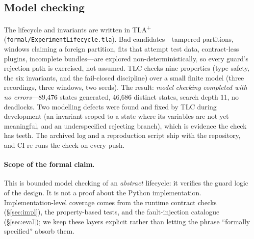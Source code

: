 \subsection{Model checking}

The lifecycle and invariants are written in TLA\textsuperscript{+}
(\texttt{formal/ExperimentLifecycle.tla}). Bad candidates---tampered
partitions, windows claiming a foreign partition, fits that attempt test
data, contract-less plugins, incomplete bundles---are explored
non-deterministically, so every guard's rejection path is exercised, not
assumed. TLC checks nine properties (type safety, the six invariants, and
the fail-closed discipline) over a small finite model (three recordings,
three windows, two seeds). The result: \emph{model checking completed with
no errors}---89{,}476 states generated, 46{,}686 distinct states, search
depth 11, no deadlocks. Two modelling defects were found and fixed by TLC
during development (an invariant scoped to a state where its variables are
not yet meaningful, and an underspecified rejecting branch), which is
evidence the check has teeth. The archived log and a reproduction script
ship with the repository, and CI re-runs the check on every push.

\paragraph{Scope of the formal claim.}
This is bounded model checking of an \emph{abstract} lifecycle: it verifies
the guard logic of the design. It is not a proof about the Python
implementation. Implementation-level coverage comes from the runtime
contract checks (\S\ref{sec:impl}), the property-based tests, and the
fault-injection catalogue (\S\ref{sec:eval}); we keep these layers explicit
rather than letting the phrase ``formally specified'' absorb them.
